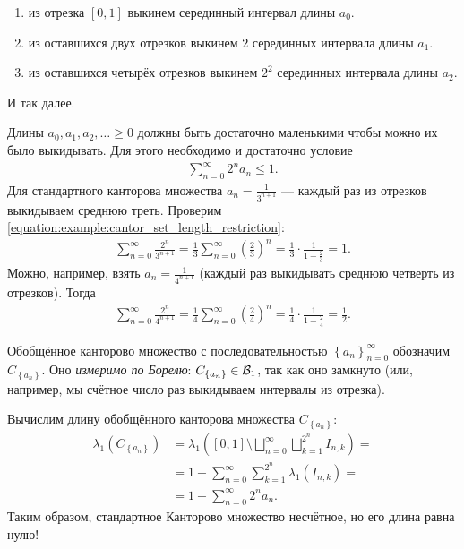 \begin{exmpl}
\begin{enumerate}
\begin{enumerate}[start=0,label={Шаг \arabic*:}]
 \item  из отрезка $[0,1]$ выкинем серединный интервал длины $a_0$.
 \item из оставшихся двух отрезков выкинем $2$ серединных интервала длины $a_1$.
 \item из оставшихся четырёх отрезков выкинем $2^{2}$  серединных интервала длины $a_2$.
\end{enumerate} И так далее.

Длины $a_0, a_1, a_2, \ldots \geqslant 0$ должны быть достаточно маленькими чтобы можно их было выкидывать. Для этого необходимо и достаточно условие
\begin{align}
 \label{equation:example:cantor_set_length_restriction}
 \sum_{n=0}^{\infty} 2^{n} a_n \leqslant 1
.\end{align} Для стандартного канторова множества $a_n = \frac{1}{3^{n+1}}$ --- каждый раз из отрезков выкидываем среднюю треть. Проверим \eqref{equation:example:cantor_set_length_restriction}:
\begin{align*}
 \sum_{n=0}^{\infty} \frac{2^{n}}{3^{n+1}} = \frac{1}{3} \sum_{n=0}^{\infty} \left( \frac{2}{3} \right)^{n} = \frac{1}{3} \cdot \frac{1}{1 - \frac{2}{3}} = 1
.\end{align*} Можно, например, взять $a_n = \frac{1}{4^{n+1}}$ (каждый раз выкидывать среднюю четверть из отрезков). Тогда
\begin{align*}
 \sum_{n=0}^{\infty} \frac{2^{n}}{4^{n+1}} = \frac{1}{4} \sum_{n=0}^{\infty} \left(\frac{2}{4}\right)^{n} = \frac{1}{4} \cdot \frac{1}{1 - \frac{2}{4}} = \frac{1}{2}
.\end{align*}

Обобщённое канторово множество с последовательностью $\left\{ a_n \right\}_{n=0}^{\infty}$ обозначим $C_{\left\{ a_n \right\}}$. Оно \textit{измеримо по Борелю}: $C_{\left\{ a_n \right\}} \in \mathcal{B}_1$, так как оно замкнуто (или, например, мы счётное число раз выкидываем интервалы из отрезка).

Вычислим длину обобщённого канторова множества $C_{\left\{ a_n \right\}}$:
\begin{align*}
 \lambda_1 \left( C_{\left\{ a_n \right\}} \right)
 & = \lambda_{1} \left( [0, 1] \setminus \bigsqcup_{n=0}^{\infty} \bigsqcup_{k=1}^{2^{n}} I_{n,k} \right) = \\
 &=  1 - \sum_{n=0}^{\infty} \sum_{k=1}^{2^{n}} \lambda_1(I_{n,k}) = \\
 &= 1 - \sum_{n=0}^{\infty} 2^{n} a_n
.\end{align*} Таким образом, стандартное Канторово множество несчётное, но его длина равна нулю!


\end{enumerate}
\end{exmpl}
